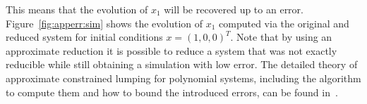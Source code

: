 This means that the evolution of $x_1$ will be recovered up to an error.
Figure~\ref{fig:apperr:sim} shows the evolution of $x_1$ computed via the original and reduced system for initial conditions $x = (1,0,0)^{T}$.
Note that by using an approximate reduction it is possible to reduce a system that was not exactly reducible while still obtaining a simulation with low error.
The detailed theory of approximate constrained lumping for polynomial systems, including the algorithm to compute them and how to bound the introduced errors, can be found in~\cite{leguizamon-robayo_approximate_2023}.












